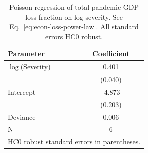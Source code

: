 \begin{table}[h]
\centering
\caption{Poisson regression of total pandemic GDP loss fraction on log severity. See Eq.~\ref{eq:econ-loss-power-law}. All standard errors HC0 robust.}
\label{tab:econ_loss_model_sev_poisson}
\begin{tabular}{lc}
\hline \hline
Parameter & Coefficient \\
\hline
$\log$(Severity) & 0.401 \\
          & (0.040) \\
Intercept & -4.873 \\
          & (0.203) \\
\hline
Deviance & 0.006 \\
N & 6 \\
\hline
\multicolumn{2}{l}{\footnotesize HC0 robust standard errors in parentheses.} \\
\end{tabular}
\end{table}
